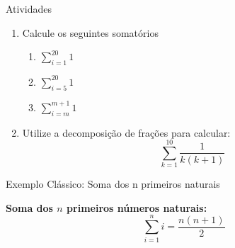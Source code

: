 \documentclass{beamer} %
\begin{document}
	
	
	
	

    
\begin{frame}{Atividades}
	\begin{enumerate}
		\item Calcule os seguintes somatórios
		\begin{enumerate}
			\item $\displaystyle \sum_{i=1}^{20} 1$\\
			\item $\displaystyle \sum_{i=5}^{20} 1$ \\
			\item $\displaystyle \sum_{i=m}^{m+1} 1$\\

		\end{enumerate}
	
		\item Utilize a decomposição de frações para calcular:
		\[
		\sum_{k=1}^{10} \frac{1}{k(k+1)}
		\]

	\end{enumerate}

\end{frame}

\begin{frame}{Exemplo Clássico: Soma dos n primeiros naturais}
    
\textbf{Soma dos \( n \) primeiros números naturais:}
\[
\displaystyle \sum_{i=1}^{n} i = \frac{n(n+1)}{2}
\]
\end{frame}
\end{document}
